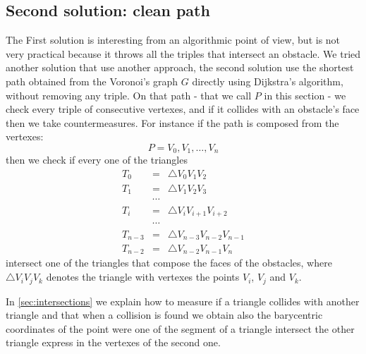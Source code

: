 \documentclass[dissertation.tex]{subfiles}
\begin{document}
\subsection{Second solution: clean path}\label{sec:inter2}
The First solution is interesting from an algorithmic point of view,
but is not very practical because it throws all the triples that
intersect an obstacle. We tried another
solution that use another approach, the second solution use the
shortest path obtained
from the Voronoi's graph $G$ directly using Dijkstra's algorithm,
without removing any triple. On that path
- that we call $P$ in this section - we
check every triple of consecutive vertexes, and if it collides with an
obstacle's face then we take countermeasures. For instance if the path
is composed from the vertexes:
\begin{equation*}
  P=V_0,V_1,\dots,V_n
\end{equation*}
then we check if every one of the triangles 
\begin{eqnarray*}
T_0 &=& \triangle V_0V_1V_2\\
T_1 &=& \triangle V_1V_2V_3\\
&\cdots&\\
T_i &=& \triangle V_iV_{i+1}V_{i+2}\\
&\cdots&\\
T_{n-3} &=& \triangle V_{n-3}V_{n-2}V_{n-1}\\
T_{n-2} &=& \triangle V_{n-2}V_{n-1}V_n
\end{eqnarray*}
intersect one of the triangles that compose the faces of the
obstacles, where $\triangle V_iV_jV_k$ denotes the triangle with
vertexes the points $V_i$, $V_j$ and $V_k$.

In \cref{sec:intersections} we explain how to measure if a triangle
collides with another triangle and that when a collision is found we
obtain also the barycentric coordinates of the point were one of the
segment of a triangle intersect the other triangle express in the
vertexes of the second one.
\end{document}
